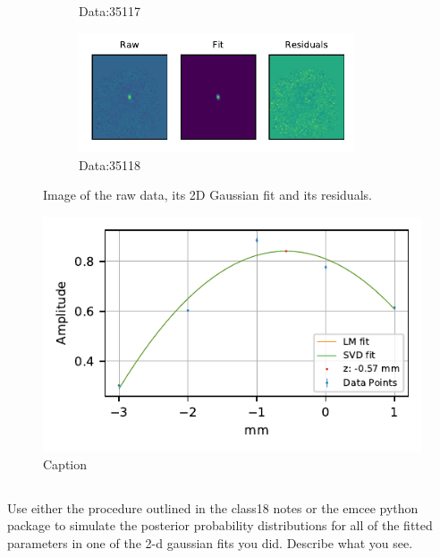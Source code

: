 \begin{figure}
\begin{subfigure}[b]{.45\textwidth}
        \caption{Data:35117}
        \label{fig:lmtFit7}
    \end{subfigure}
    \begin{subfigure}[b]{.45\textwidth}
        \centering
        \includegraphics[height=100pt]{CodeAndFigures/DataFits8.pdf}
        \caption{Data:35118}
        \label{fig:lmtFit8}
    \end{subfigure}
    \caption{Image of the raw data, its 2D Gaussian fit and its residuals.}
    \label{fig:lmtRaw}
\end{figure}


\begin{figure}
    \centering
    \includegraphics{CodeAndFigures/QuadFitPlot.pdf}
    \caption{Caption}
    \label{fig:lmtquadfit}
\end{figure}

\subsection{}

Use either the procedure outlined in the class18 notes or the emcee python package to simulate the posterior probability distributions for all of the fitted parameters
in one of the 2-d gaussian fits you did. Describe what you see.
